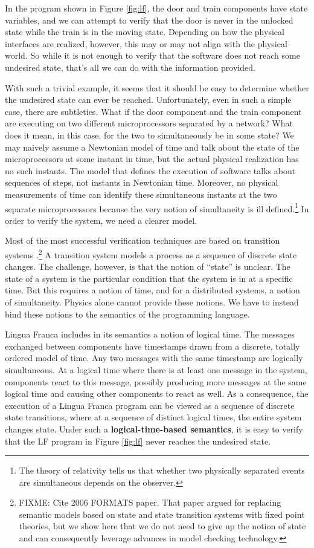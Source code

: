 \documentclass{article}
\begin{document}
In the program shown in Figure \ref{fig:lf}, the door and train components
have state variables, and we can attempt to verify that the door is never in the unlocked
state while the train is in the moving state.
Depending on how the physical interfaces are realized, however,
this may or may not align with the physical world.
So while it is not enough to verify that the software does not reach some undesired state,
that's all we can do with the information provided.

With such a trivial example, it seems that it should be easy to determine whether the undesired
state can ever be reached.
Unfortunately, even in such a simple case, there are subtleties.
What if the door component and the train component are executing on two different microprocessors
separated by a network?
What does it mean, in this case, for the two to simultaneously be in some state?
We may naively assume a Newtonian model of time and talk about the state of the microprocessors at
some instant in time, but the actual physical realization has no such instants.
The model that defines the execution of software talks about sequences of steps, not
instants in Newtonian time.
Moreover, no physical measurements of time can identify these simultaneous instants at the two
separate microprocessors because the very notion of simultaneity is ill defined.\footnote{The theory
of relativity tells us that whether two physically separated events are simultaneous depends on the observer.}
In order to verify the system, we need a clearer model.

Most of the most successful verification techniques are based on transition systems \cite{FIXME}.\footnote{FIXME: Cite 2006 FORMATS paper.
That paper argued for replacing semantic models based on state and state transition systems with fixed point theories,
but we show here that we do not need to give up the notion of state and can consequently leverage
advances in model checking technology.
}
A transition system models a process as a sequence of discrete state changes.
The challenge, however, is that the notion of ``state'' is unclear.
The state of a system is the particular condition that the system is in at a specific time.
But this requires a notion of time, and for a distributed systems, a notion of simultaneity.
Physics alone cannot provide these notions.
We have to instead bind these notions to the semantics of the programming language.

Lingua Franca includes in its semantics a notion of logical time.
The messages exchanged between components have timestamps drawn from a discrete, totally ordered model of time.
Any two messages with the same timestamp are logically simultaneous.
At a logical time where there is at least one message in the system,
components react to this message, possibly producing more messages at the same logical time
and causing other components to react as well.
As a consequence, the execution of a Lingua Franca program can be viewed as a sequence
of discrete state transitions, where at a sequence of distinct logical times,
the entire system changes state.
Under such a \textbf{logical-time-based semantics}, it is easy to verify that the LF program
in Figure \ref{fig:lf} never reaches the undesired state.
\end{document}
